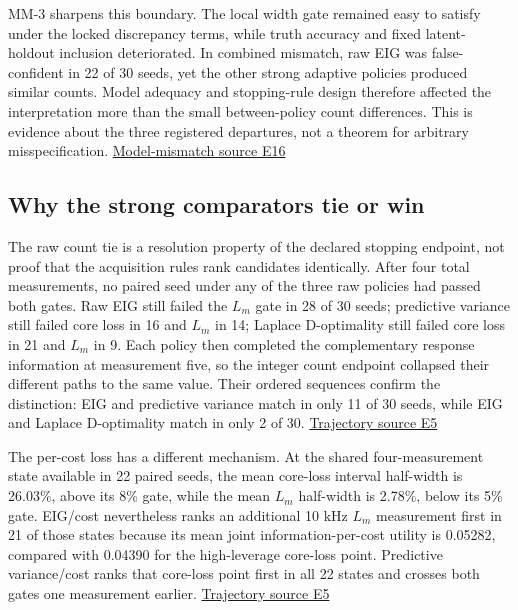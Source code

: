 MM-3 sharpens this boundary. The local width gate remained easy to
satisfy under the locked discrepancy terms, while truth accuracy and
fixed latent- holdout inclusion deteriorated. In combined mismatch, raw
EIG was false- confident in 22 of 30 seeds, yet the other strong
adaptive policies produced similar counts. Model adequacy and
stopping-rule design therefore affected the interpretation more than the
small between-policy count differences. This is evidence about the three
registered departures, not a theorem for arbitrary misspecification.
\href{https://github.com/hoangduong6210/EIG-bayesian-for-Recover-potential-Physical-Parameter-of-MagComponent/blob/927bbcb6d0b862598fae87d2575a872bbd79b5f1/wiki/evidence/Evidence-Sources.md\#e16}{Model-mismatch
source E16}

\hypertarget{why-the-strong-comparators-tie-or-win}{%
\subsection{Why the strong comparators tie or
win}\label{why-the-strong-comparators-tie-or-win}}

The raw count tie is a resolution property of the declared stopping
endpoint, not proof that the acquisition rules rank candidates
identically. After four total measurements, no paired seed under any of
the three raw policies had passed both gates. Raw EIG still failed the
\(L_m\) gate in 28 of 30 seeds; predictive variance still failed core
loss in 16 and \(L_m\) in 14; Laplace D-optimality still failed core
loss in 21 and \(L_m\) in 9. Each policy then completed the
complementary response information at measurement five, so the integer
count endpoint collapsed their different paths to the same value. Their
ordered sequences confirm the distinction: EIG and predictive variance
match in only 11 of 30 seeds, while EIG and Laplace D-optimality match
in only 2 of 30.
\href{https://github.com/hoangduong6210/EIG-bayesian-for-Recover-potential-Physical-Parameter-of-MagComponent/blob/927bbcb6d0b862598fae87d2575a872bbd79b5f1/wiki/evidence/Evidence-Sources.md\#e5}{Trajectory
source E5}

The per-cost loss has a different mechanism. At the shared
four-measurement state available in 22 paired seeds, the mean core-loss
interval half-width is 26.03\%, above its 8\% gate, while the mean
\(L_m\) half-width is 2.78\%, below its 5\% gate. EIG/cost nevertheless
ranks an additional 10 kHz \(L_m\) measurement first in 21 of those
states because its mean joint information-per-cost utility is 0.05282,
compared with 0.04390 for the high-leverage core-loss point. Predictive
variance/cost ranks that core-loss point first in all 22 states and
crosses both gates one measurement earlier.
\href{https://github.com/hoangduong6210/EIG-bayesian-for-Recover-potential-Physical-Parameter-of-MagComponent/blob/927bbcb6d0b862598fae87d2575a872bbd79b5f1/wiki/evidence/Evidence-Sources.md\#e5}{Trajectory
source E5}

